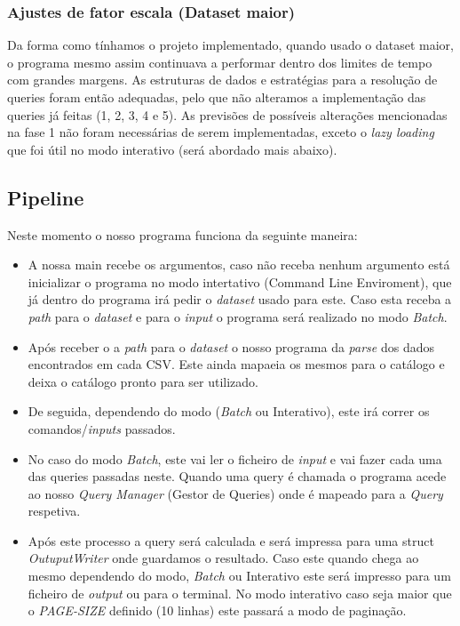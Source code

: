 \documentclass{article}
\begin{document}
        \subsubsection{Ajustes de fator escala (Dataset maior)}
            Da forma como tínhamos o projeto implementado, quando 
            usado o dataset maior, o programa mesmo assim continuava
            a performar dentro dos limites de tempo com grandes 
            margens. As estruturas de dados e estratégias para
            a resolução de queries foram então adequadas, pelo que
            não alteramos a implementação das queries já feitas
            (1, 2, 3, 4 e 5). As previsões de possíveis alterações
            mencionadas na fase 1 não foram necessárias de serem
            implementadas, exceto o \emph{lazy loading} que foi
            útil no modo interativo (será abordado mais abaixo).

    \subsection{Pipeline}
        Neste momento o nosso programa funciona da seguinte maneira:
        \begin{itemize}
            \item A nossa main recebe os argumentos, caso não receba nenhum argumento 
            está inicializar o programa no modo intertativo (Command Line Enviroment), 
            que já dentro do programa irá pedir o \emph{dataset} usado para este. Caso 
            esta receba a \emph{path} para o \emph{dataset} e para o \emph{input} o programa 
            será realizado no modo \emph{Batch}.
            \item Após receber o a \emph{path} para o \emph{dataset} o nosso programa da
            \emph{parse} dos dados encontrados em cada CSV. Este ainda mapaeia os mesmos 
            para o catálogo e deixa o catálogo pronto para ser utilizado.
            \item De seguida, dependendo do modo (\emph{Batch} ou Interativo), este irá 
            correr os comandos/\emph{inputs} passados.
            \item No caso do modo \emph{Batch}, este vai ler o ficheiro de \emph{input} 
            e vai fazer cada uma das queries passadas neste. Quando uma query é chamada 
            o programa acede ao nosso \emph{Query Manager} (Gestor de Queries) onde é 
            mapeado para a \emph{Query} respetiva. 
            \item Após este processo a query será calculada e será impressa para uma struct
            \emph{OutuputWriter} onde guardamos o resultado. Caso este quando chega ao mesmo 
            dependendo do modo, \emph{Batch} ou Interativo este será impresso para um ficheiro
            de \emph{output} ou para o terminal. No modo interativo caso seja maior que o 
            \emph{PAGE-SIZE} definido (10 linhas) este passará a modo de paginação. 
            
        \end{itemize}
\end{document}
